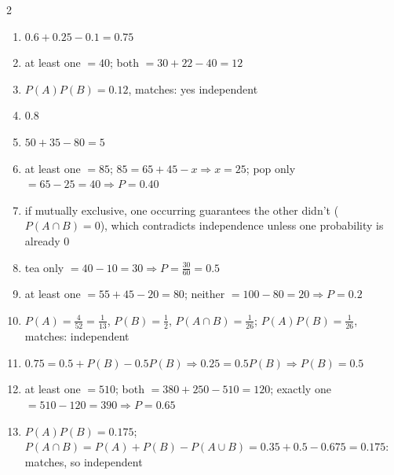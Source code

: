 \documentclass[11pt]{article}
\begin{document}
\begin{keybox}
\begin{multicols}{2}
\small
\begin{enumerate}[leftmargin=*,itemsep=3pt]
  \item $0.6+0.25-0.1=0.75$
  \item at least one $=40$; both $=30+22-40=12$
  \item $P(A)P(B)=0.12$, matches: yes independent
  \item $0.8$
  \item $50+35-80=5$
  \item at least one $=85$; $85=65+45-x\Rightarrow x=25$; pop only $=65-25=40\Rightarrow P=0.40$
  \item if mutually exclusive, one occurring guarantees the other didn't ($P(A\cap B)=0$), which contradicts independence unless one probability is already 0
  \item tea only $=40-10=30\Rightarrow P=\tfrac{30}{60}=0.5$
  \item at least one $=55+45-20=80$; neither $=100-80=20\Rightarrow P=0.2$
  \item $P(A)=\tfrac{4}{52}=\tfrac1{13}$, $P(B)=\tfrac12$, $P(A\cap B)=\tfrac1{26}$; $P(A)P(B)=\tfrac1{26}$, matches: independent
  \item $0.75=0.5+P(B)-0.5P(B)\Rightarrow0.25=0.5P(B)\Rightarrow P(B)=0.5$
  \item at least one $=510$; both $=380+250-510=120$; exactly one $=510-120=390\Rightarrow P=0.65$
  \item $P(A)P(B)=0.175$; $P(A\cap B)=P(A)+P(B)-P(A\cup B)=0.35+0.5-0.675=0.175$: matches, so independent
\end{enumerate}
\end{multicols}
\end{keybox}
\end{document}
